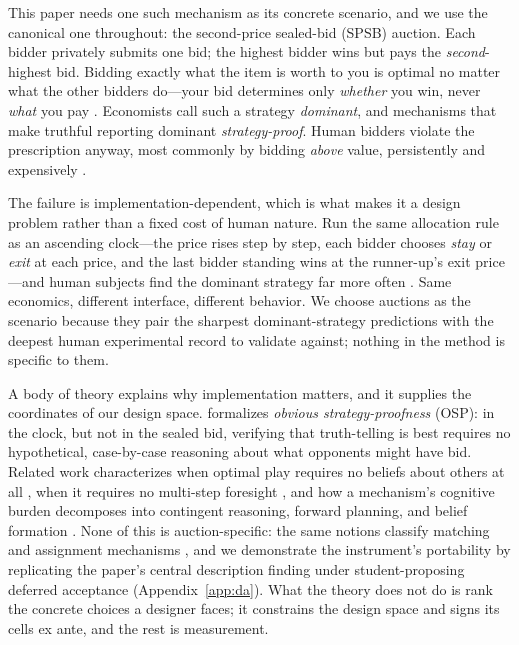 This paper needs one such mechanism as its concrete scenario, and we use the canonical one throughout: the second-price sealed-bid (SPSB) auction. Each bidder privately submits one bid; the highest bidder wins but pays the \emph{second}-highest bid. Bidding exactly what the item is worth to you is optimal no matter what the other bidders do---your bid determines only \emph{whether} you win, never \emph{what} you pay \citep{vickrey1961counterspeculation}. Economists call such a strategy \emph{dominant}, and mechanisms that make truthful reporting dominant \emph{strategy-proof}. Human bidders violate the prescription anyway, most commonly by bidding \emph{above} value, persistently and expensively \citep{kagel1993independent, kagel1995individual}.

The failure is implementation-dependent, which is what makes it a design problem rather than a fixed cost of human nature. Run the same allocation rule as an ascending clock---the price rises step by step, each bidder chooses \emph{stay} or \emph{exit} at each price, and the last bidder standing wins at the runner-up's exit price---and human subjects find the dominant strategy far more often \citep{li2017obviously, breitmoser2022obviousness}. Same economics, different interface, different behavior. We choose auctions as the scenario because they pair the sharpest dominant-strategy predictions with the deepest human experimental record to validate against; nothing in the method is specific to them.

A body of theory explains why implementation matters, and it supplies the coordinates of our design space. \citet{li2017obviously} formalizes \emph{obvious strategy-proofness} (OSP): in the clock, but not in the sealed bid, verifying that truth-telling is best requires no hypothetical, case-by-case reasoning about what opponents might have bid. Related work characterizes when optimal play requires no beliefs about others at all \citep{borgers2019strategically}, when it requires no multi-step foresight \citep{pycia2023theory}, and how a mechanism's cognitive burden decomposes into contingent reasoning, forward planning, and belief formation \citep{li2024designing}. None of this is auction-specific: the same notions classify matching and assignment mechanisms \citep{ashlagi2018stable}, and we demonstrate the instrument's portability by replicating the paper's central description finding under student-proposing deferred acceptance (Appendix~\ref{app:da}). What the theory does not do is rank the concrete choices a designer faces; it constrains the design space and signs its cells ex ante, and the rest is measurement.

